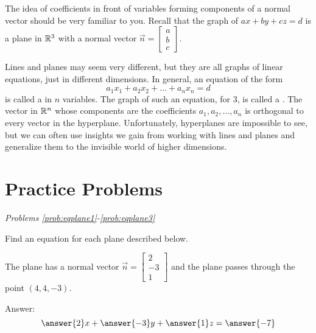 \documentclass{ximera}
\begin{document}
 
 
\begin{onlineOnly}
\begin{center}
\end{center}
\end{onlineOnly}
 
The idea of coefficients in front of variables forming components of a normal vector should be very familiar to you.  Recall that the graph of $ax+by+cz=d$ is a plane in $\mathbb{R}^3$ with a normal vector $\vec{n}=\begin{bmatrix}a\\b\\c\end{bmatrix}$.


 
Lines and planes may seem very different, but they are all graphs of linear equations, just in different dimensions.  In general, an equation of the form
$$a_1x_1+a_2x_2+\dots +a_nx_n=d$$
is called a  in $n$ variables.  The graph of such an equation, for $3$, is called a .  The vector in $\mathbb{R}^n$ whose components are the coefficients $a_1, a_2, \dots ,a_n$ is orthogonal to every vector in the hyperplane.  Unfortunately, hyperplanes are impossible to see, but we can often use insights we gain from working with lines and planes and generalize them to the invisible world of higher dimensions.



 
\section*{Practice Problems}
 
\emph{Problems \ref{prob:eqplane1}-\ref{prob:eqplane3}}
 
Find an equation for each plane described below.
 
  \begin{problem}\label{prob:eqplane1}
  The plane has a normal vector $\vec{n}=\begin{bmatrix}2\\-3\\1\end{bmatrix}$ and the plane passes through the point $(4, 4, -3)$.
   
  Answer: $$\answer{2}x+\answer{-3}y+\answer{1}z=\answer{-7}$$
  \end{problem}
   
\end{document}
